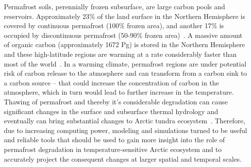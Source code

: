 \documentclass[review]{elsarticle}
\begin{document}
Permafrost soils, perennially frozen subsurface, are large carbon pools and reservoirs. Approximately 23\% of the land surface in the Northern Hemisphere is covered by continuous permafrost (100\% frozen area), and another 17\% is occupied by discontinuous permafrost (50-90\% frozen area)~\cite{brown1997circum,jorgenson2001permafrost}. A massive amount of organic carbon (approximately 1672 Pg) is stored in the Northern Hemisphere and these high-latitude regions are warming at a rate considerably faster than most of the world~\cite{tarnocai2009soil, turner2007arctic, hansen1999giss, assessment2004impacts}. In a warming climate, permafrost regions are under potential risk of carbon release to the atmosphere and can transform from a carbon sink to a carbon source -- that could increase the concentration of carbon in the atmosphere, which in turn would lead to further increase in the temperature. Thawing of permafrost and thereby it's considerable degradation can cause significant changes in the surface and subsurface thermal hydrology and eventually can bring substantial changes to Arctic tundra ecosystem~\cite{osterkamp1983response, walvoord2007increased, lyon2009estimation, pachauri2014climate}. Therefore, due to increasing computing power, modeling and simulations turned to be useful and reliable tools that should be used to gain more insight into the role of permafrost degradation in temperature-sensitive Arctic ecosystem and to accurately project the consequent changes at larger spatial and temporal scales.
\end{document}

